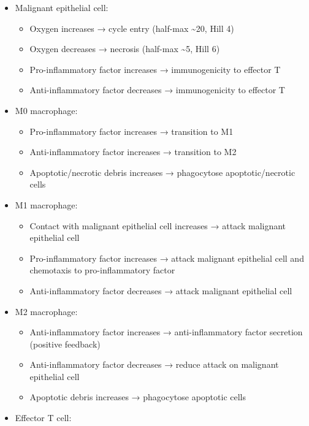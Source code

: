 \begin{itemize}
\tightlist
\item
  Malignant epithelial cell:

  \begin{itemize}
  \tightlist
  \item
    Oxygen increases → cycle entry (half-max \textasciitilde20, Hill 4)
  \item
    Oxygen decreases → necrosis (half-max \textasciitilde5, Hill 6)
  \item
    Pro-inflammatory factor increases → immunogenicity to effector T
  \item
    Anti-inflammatory factor decreases → immunogenicity to effector T
  \end{itemize}
\item
  M0 macrophage:

  \begin{itemize}
  \tightlist
  \item
    Pro-inflammatory factor increases → transition to M1
  \item
    Anti-inflammatory factor increases → transition to M2
  \item
    Apoptotic/necrotic debris increases → phagocytose apoptotic/necrotic
    cells
  \end{itemize}
\item
  M1 macrophage:

  \begin{itemize}
  \tightlist
  \item
    Contact with malignant epithelial cell increases → attack malignant
    epithelial cell
  \item
    Pro-inflammatory factor increases → attack malignant epithelial cell
    and chemotaxis to pro-inflammatory factor
  \item
    Anti-inflammatory factor decreases → attack malignant epithelial
    cell
  \end{itemize}
\item
  M2 macrophage:

  \begin{itemize}
  \tightlist
  \item
    Anti-inflammatory factor increases → anti-inflammatory factor
    secretion (positive feedback)
  \item
    Anti-inflammatory factor decreases → reduce attack on malignant
    epithelial cell
  \item
    Apoptotic debris increases → phagocytose apoptotic cells
  \end{itemize}
\item
  Effector T cell:


\end{itemize}
